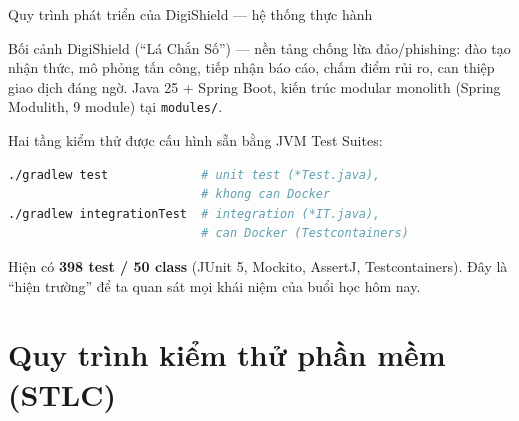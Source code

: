 \documentclass[aspectratio=169,12pt]{beamer}
\begin{document}
\begin{frame}[fragile]{Quy trình phát triển của DigiShield --- hệ thống thực hành}
  \begin{block}{Bối cảnh}
    DigiShield (``Lá Chắn Số'') --- nền tảng chống lừa đảo/phishing: đào tạo nhận thức,
    mô phỏng tấn công, tiếp nhận báo cáo, chấm điểm rủi ro, can thiệp giao dịch đáng ngờ.
    Java 25 + Spring Boot, kiến trúc modular monolith (Spring Modulith, 9 module)
    tại \texttt{modules/}.
  \end{block}

  \vspace{0.2em}
  Hai tầng kiểm thử được cấu hình sẵn bằng JVM Test Suites:
\begin{lstlisting}[language=bash]
./gradlew test             # unit test (*Test.java),
                           # khong can Docker
./gradlew integrationTest  # integration (*IT.java),
                           # can Docker (Testcontainers)
\end{lstlisting}

  \small Hiện có \textbf{398 test / 50 class} (JUnit 5, Mockito, AssertJ,
  Testcontainers). Đây là ``hiện trường'' để ta quan sát mọi khái niệm của buổi học hôm nay.
\end{frame}

\section{Quy trình kiểm thử phần mềm (STLC)}
\end{document}
